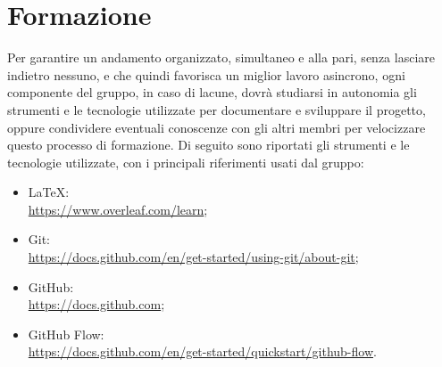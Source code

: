\section{Formazione}
Per garantire un andamento organizzato, simultaneo e alla pari, senza lasciare indietro nessuno, e che quindi favorisca un miglior lavoro
asincrono, ogni componente del gruppo, in caso di lacune, dovrà studiarsi in autonomia gli strumenti e le tecnologie utilizzate per documentare e sviluppare
il progetto, oppure condividere eventuali conoscenze con gli altri membri per velocizzare questo processo di formazione.
\newline
Di seguito sono riportati gli strumenti e le tecnologie utilizzate, con i principali riferimenti usati dal gruppo:
\begin{itemize}
    \item LaTeX:\\ \url{https://www.overleaf.com/learn};
    \item Git:\\ \url{https://docs.github.com/en/get-started/using-git/about-git};
    \item GitHub:\\ \url{https://docs.github.com};
    \item GitHub Flow:\\ \url{https://docs.github.com/en/get-started/quickstart/github-flow}.
\end{itemize}
